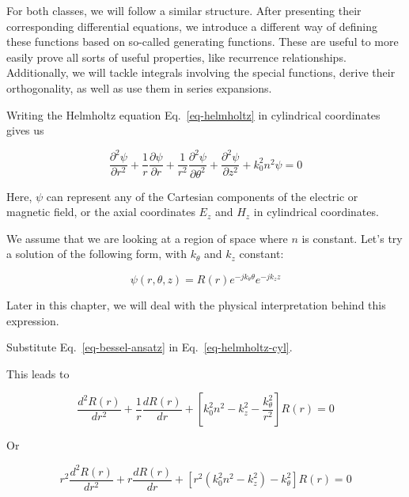 For both classes, we will follow a similar structure. After presenting their corresponding differential equations, we introduce a different way of defining these functions based on so-called generating functions. These are useful to more easily prove all sorts of useful properties, like recurrence relationships. Additionally, we will tackle integrals involving the special functions, derive their orthogonality, as well as use them in series expansions.


\pagebreak


\label{sec-bessel-eq}

Writing the Helmholtz equation Eq.~\ref{eq-helmholtz} in cylindrical coordinates gives us

\begin{equation}
\frac{\partial^2 \psi}{\partial r^2} + \frac{1}{r} \frac{\partial \psi}{\partial r} +\frac{1}{r^2} \frac{\partial^2 \psi}{\partial \theta^2} + \frac{\partial^2 \psi}{\partial z^2} + k_0^2 n^2\psi = 0 \label{eq-helmholtz-cyl}
\end{equation}

Here, $\psi$ can represent any of the Cartesian components of the electric or magnetic field, or the axial coordinates $E_z$ and $H_z$ in cylindrical coordinates.

We assume that we are looking at a region of space where $n$ is constant. Let's try a solution of the following form, with $k_\theta$ and $k_z$ constant: 

\begin{equation}
\psi(r,\theta,z) = R(r)e^{-j k_\theta \theta }e^{-j k_z z}
\label{eq-bessel-ansatz}
\end{equation}  

Later in this chapter, we will deal with the physical interpretation behind this expression.

\begin{cue}
Substitute Eq.~\ref{eq-bessel-ansatz} in Eq.~\ref{eq-helmholtz-cyl}.
\end{cue}

This leads to

\begin{equation}
\frac{d^2 R(r)}{d r^2} + \frac{1}{r} \frac{d R(r)}{d r} + \left[k_0^2 n^2 - k_z^2 - \frac{k_\theta^2}{r^2} \right] R(r) = 0
\end{equation} 

Or

\begin{equation}
r^2\frac{d^2 R(r)}{d r^2} + r \frac{d R(r)}{d r} + \left[ r^2 (k_0^2 n^2 - k_z^2)- k_\theta^2 \right] R(r) = 0
\end{equation}

